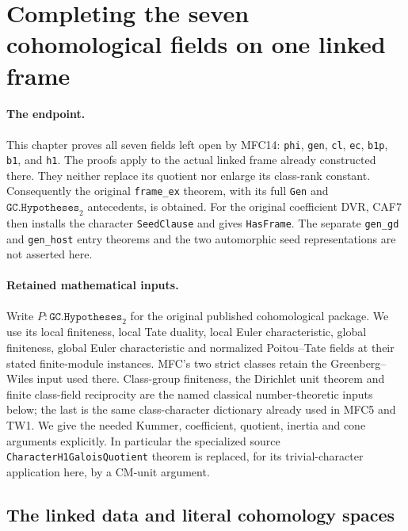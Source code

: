 \section{Completing the seven cohomological fields on one linked frame}
\label{sec:linked-frame-completion}

\paragraph{The endpoint.}
This chapter proves all seven fields left open by MFC14:
\texttt{phi}, \texttt{gen}, \texttt{cl}, \texttt{ec},
\texttt{b1p}, \texttt{b1}, and \texttt{h1}.
The proofs apply to the actual linked frame already constructed there.
They neither replace its quotient nor enlarge its class-rank constant.
Consequently the original \texttt{frame\_ex} theorem, with its full
\texttt{Gen} and \(\texttt{GC.Hypotheses}_{2}\) antecedents, is obtained.
For the original coefficient DVR, CAF7 then installs the character
\texttt{SeedClause} and gives \texttt{HasFrame}.
The separate \texttt{gen\_gd} and \texttt{gen\_host} entry theorems and
the two automorphic seed representations are not asserted here.

\paragraph{Retained mathematical inputs.}
Write \(P:\texttt{GC.Hypotheses}_{2}\) for the original published
cohomological package.  We use its local finiteness, local Tate
duality, local Euler characteristic, global finiteness, global Euler
characteristic and normalized Poitou--Tate fields at their stated
finite-module instances.  MFC's two strict classes retain the
Greenberg--Wiles input used there.  Class-group finiteness, the
Dirichlet unit theorem and finite class-field reciprocity are the
named classical number-theoretic inputs below; the last is the
same class-character dictionary already used in MFC5 and TW1.
We give the needed Kummer, coefficient, quotient, inertia and cone
arguments explicitly.  In particular the specialized source
\texttt{CharacterH1GaloisQuotient} theorem is replaced, for its
trivial-character application here, by a CM-unit argument.

\subsection{The linked data and literal cohomology spaces}


